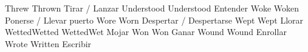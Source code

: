 	            {Threw}{}	            {Thrown}{}              {Tirar / Lanzar}{}
	        {Understood}{}	        {Understood}{}          {Entender}{}
	            {Woke}{}	            {Woken}{}               {Ponerse / Llevar puerto}{}
	            {Wore}{}	            {Worn}{}                {Despertar / Despertarse}{}
	            {Wept}{}	            {Wept}{}                {Llorar}{}
	            {Wetted}{Wetted}	    {Wetted}{Wet}           {Mojar}{}
	            {Won}{}	                {Won}{}                 {Ganar}{}
	            {Wound}{}	            {Wound}{}               {Enrollar}{}
	            {Wrote}{}	            {Written}{}             {Escribir}{}